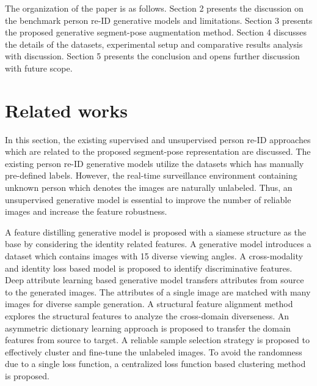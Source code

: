 \documentclass[preprint,12pt]{elsarticle}
\begin{document}
The organization of the paper is as follows. Section 2 presents the discussion on the benchmark person re-ID generative models and limitations. Section 3 presents the proposed generative segment-pose augmentation method. Section 4 discusses the details of the datasets, experimental setup and comparative results analysis with discussion. Section 5 presents the conclusion and opens further discussion with future scope.

\section{Related works} \label{section2}
In this section, the existing supervised and unsupervised person re-ID approaches which are related to the proposed segment-pose representation are discussed. The existing person re-ID generative models utilize the datasets which has manually pre-defined labels. However, the real-time surveillance environment containing unknown person which denotes the images are naturally unlabeled. Thus, an unsupervised generative model is essential to improve the number of reliable images and increase the feature robustness. 




A feature distilling generative model \cite{fd} is proposed with a siamese structure as the base by considering the identity related features. A generative model \cite{ptgan} introduces a dataset which contains images with 15 diverse viewing angles. A cross-modality and identity loss based model \cite{cross} is proposed to identify discriminative features. Deep attribute learning based generative model \cite{deepattr} transfers attributes from source to the generated images. The attributes of a single image are matched with many images for diverse sample generation. A structural feature alignment method \cite{lit3} explores the structural features to analyze the cross-domain diverseness. An asymmetric dictionary learning approach \cite{umdl} is proposed to transfer the domain features from source to target. A reliable sample selection strategy \cite{pul} is proposed to effectively cluster and fine-tune the unlabeled images. To avoid the randomness due to a single loss function, a centralized loss function based clustering method \cite{cclf} is proposed. 
\end{document}
